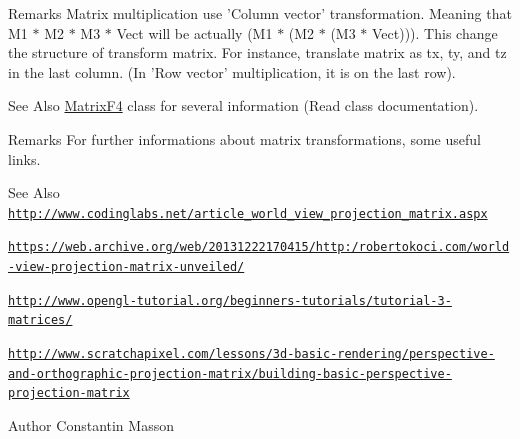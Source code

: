 \begin{DoxyRemark}{Remarks}
Matrix multiplication use 'Column vector' transformation. Meaning that M1 $\ast$ M2 $\ast$ M3 $\ast$ Vect will be actually (M1 $\ast$ (M2 $\ast$ (M3 $\ast$ Vect))). This change the structure of transform matrix. For instance, translate matrix as tx, ty, and tz in the last column. (In 'Row vector' multiplication, it is on the last row).
\end{DoxyRemark}
\begin{DoxySeeAlso}{See Also}
\hyperlink{classMatrixF4}{Matrix\-F4} class for several information (Read class documentation).
\end{DoxySeeAlso}
\begin{DoxyRemark}{Remarks}
For further informations about matrix transformations, some useful links.
\end{DoxyRemark}
\begin{DoxySeeAlso}{See Also}
\href{http://www.codinglabs.net/article_world_view_projection_matrix.aspx}{\tt http\-://www.\-codinglabs.\-net/article\-\_\-world\-\_\-view\-\_\-projection\-\_\-matrix.\-aspx} 

\href{https://web.archive.org/web/20131222170415/http:/robertokoci.com/world-view-projection-matrix-unveiled/}{\tt https\-://web.\-archive.\-org/web/20131222170415/http\-:/robertokoci.\-com/world-\/view-\/projection-\/matrix-\/unveiled/} 

\href{http://www.opengl-tutorial.org/beginners-tutorials/tutorial-3-matrices/}{\tt http\-://www.\-opengl-\/tutorial.\-org/beginners-\/tutorials/tutorial-\/3-\/matrices/} 

\href{http://www.scratchapixel.com/lessons/3d-basic-rendering/perspective-and-orthographic-projection-matrix/building-basic-perspective-projection-matrix}{\tt http\-://www.\-scratchapixel.\-com/lessons/3d-\/basic-\/rendering/perspective-\/and-\/orthographic-\/projection-\/matrix/building-\/basic-\/perspective-\/projection-\/matrix}
\end{DoxySeeAlso}
\begin{DoxyAuthor}{Author}
Constantin Masson 
\end{DoxyAuthor}


